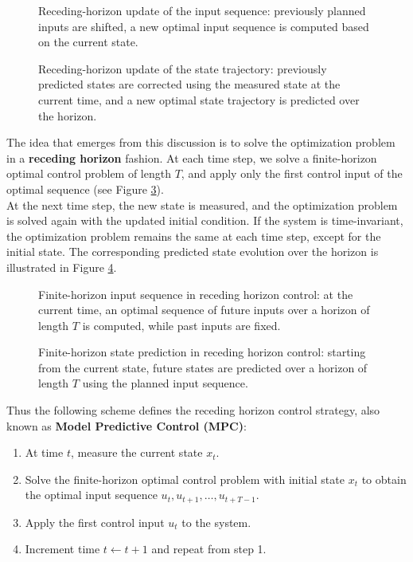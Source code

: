 \begin{figure}[!ht]
\centering

\caption{Receding-horizon update of the input sequence: previously planned inputs are shifted, a new optimal input sequence is computed based on the current state.}
\label{fig:mpc_01}
\end{figure}

\begin{figure}[!ht]
\centering

\caption{Receding-horizon update of the state trajectory: previously predicted states are corrected using the measured state at the current time, and a new optimal state trajectory is predicted over the horizon.}
\label{fig:mpc_02}
\end{figure}

The idea that emerges from this discussion is to solve the optimization problem in a \textbf{receding horizon} fashion. At each time step, we solve a finite-horizon optimal control problem of length $T$, and apply only the first control input of the optimal sequence (see Figure \ref{fig:mpc_03}).\\
At the next time step, the new state is measured, and the optimization problem is solved again with the updated initial condition. If the system is time-invariant, the optimization problem remains the same at each time step, except for the initial state. The corresponding predicted state evolution over the horizon is illustrated in Figure \ref{fig:mpc_04}.\\

\begin{figure}[!ht]
\centering

\caption{Finite-horizon input sequence in receding horizon control: at the current time, an optimal sequence of future inputs over a horizon of length $T$ is computed, while past inputs are fixed.}
\label{fig:mpc_03}
\end{figure}

\begin{figure}[!ht]
\centering

\caption{Finite-horizon state prediction in receding horizon control: starting from the current state, future states are predicted over a horizon of length $T$ using the planned input sequence.}
\label{fig:mpc_04}
\end{figure}

Thus the following scheme defines the receding horizon control strategy, also known as \textbf{Model Predictive Control (MPC)}:
\begin{enumerate}
\item At time $t$, measure the current state $x_t$.
\item Solve the finite-horizon optimal control problem with initial state $x_t$ to obtain the optimal input sequence $u_t, u_{t+1}, \ldots, u_{t+T-1}$.
\item Apply the first control input $u_t$ to the system.
\item Increment time $t \leftarrow t+1$ and repeat from step 1.
\end{enumerate}


